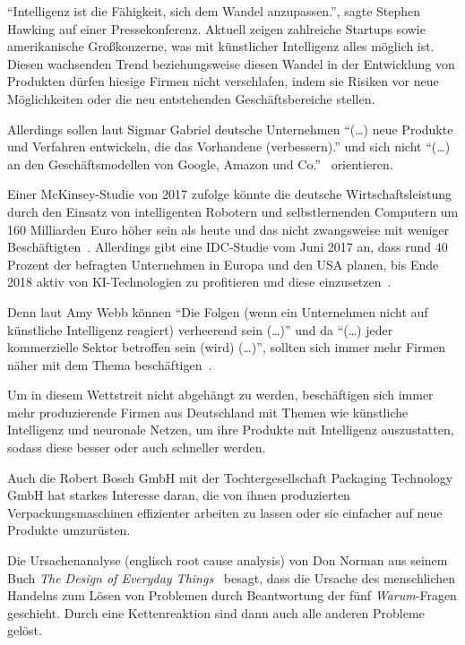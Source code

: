 \enquote{Intelligenz ist die Fähigkeit, sich dem Wandel anzupassen.}, sagte Stephen Hawking auf einer Pressekonferenz.
Aktuell zeigen zahlreiche Startups sowie amerikanische Großkonzerne, was mit künstlicher Intelligenz alles möglich ist.
Diesen wachsenden Trend beziehungsweise diesen Wandel in der Entwicklung von Produkten dürfen hiesige Firmen nicht
verschlafen, indem sie Risiken vor neue Möglichkeiten oder die neu entstehenden Geschäftsbereiche stellen.

Allerdings sollen laut Sigmar Gabriel deutsche Unternehmen \enquote{(\ldots) neue Produkte und Verfahren
entwickeln, die das Vorhandene (verbessern).} und sich nicht \enquote{(\ldots) an den Geschäftsmodellen von Google,
Amazon und Co.}~\cite{article_einleitung_ww_sg} orientieren.

Einer McKinsey-Studie von 2017 zufolge könnte die deutsche Wirtschaftsleistung durch den Einsatz von intelligenten
Robotern und selbstlernenden Computern um 160 Milliarden Euro höher sein als heute und das nicht zwangsweise mit weniger
Beschäftigten~\cite{online_einleitung_mckinsey}. Allerdings gibt eine IDC-Studie vom Juni 2017 an, dass rund 40 Prozent
der befragten Unternehmen in Europa und den USA planen, bis Ende 2018 aktiv von KI-Technologien zu profitieren und diese
einzusetzen~\cite{article_grundlagen_salesforce}.

Denn laut Amy Webb können \enquote{Die Folgen (wenn ein Unternehmen nicht auf künstliche Intelligenz reagiert)
verheerend sein (\ldots)} und da \enquote{(\ldots) jeder kommerzielle Sektor betroffen sein (wird) (\ldots)}, sollten
sich immer mehr Firmen näher mit dem Thema beschäftigen~\cite{article_einleitung_dub_aw}.

Um in diesem Wettstreit nicht abgehängt zu werden, beschäftigen sich immer mehr produzierende Firmen aus Deutschland mit
Themen wie künstliche Intelligenz und neuronale Netzen, um ihre Produkte mit Intelligenz auszustatten, sodass diese
besser oder auch schneller werden.

Auch die Robert Bosch GmbH mit der Tochtergesellschaft Packaging Technology GmbH hat starkes Interesse daran, die von
ihnen produzierten Verpackungsmaschinen effizienter arbeiten zu lassen oder sie einfacher auf neue Produkte umzurüsten.

Die Ursachenanalyse (englisch root cause analysis) von Don Norman aus seinem Buch \textit{The Design of Everyday
Things}~\cite{book_einleitung_donnorman} besagt, dass die Ursache des menschlichen Handelns zum Lösen von Problemen
durch Beantwortung der fünf \textit{Warum}-Fragen geschieht. Durch eine Kettenreaktion sind dann auch alle anderen
Probleme gelöst.

